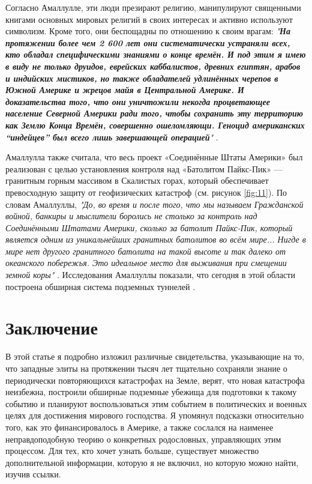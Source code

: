 \documentclass[10pt,twocolumn,letterpaper]{article}
\begin{document}
Согласно Амаллулле, эти люди презирают религию, манипулируют священными книгами основных мировых религий в своих интересах и активно используют символизм. Кроме того, они беспощадны по отношению к своим врагам: \textit{"\textbf{На протяжении более чем 2 600 лет они систематически устраняли всех, кто обладал специфическими знаниями о конце времён. И под этим я имею в виду не только друидов, еврейских каббалистов, древних египтян, арабов и индийских мистиков, но также обладателей удлинённых черепов в Южной Америке и жрецов майя в Центральной Америке. И доказательства того, что они уничтожили некогда процветающее население Северной Америки ради того, чтобы сохранить эту территорию как Землю Конца Времён, совершенно ошеломляющи. Геноцид американских “индейцев” был всего лишь завершающей операцией}"} \cite{33,34}.

Амаллулла также считала, что весь проект «Соединённые Штаты Америки» был реализован с целью установления контроля над «Батолитом Пайкс-Пик» — гранитным горным массивом в Скалистых горах, который обеспечивает превосходную защиту от геофизических катастроф (см. рисунок \ref{fig:11}). По словам Амаллуллы, \textit{"До, во время и после того, что мы называем Гражданской войной, банкиры и мыслители боролись не столько за контроль над Соединёнными Штатами Америки, сколько за батолит Пайкс-Пик, который является одним из уникальнейших гранитных батолитов во всём мире... Нигде в мире нет другого гранитного батолита на такой высоте и так далеко от океанского побережья. Это идеальное место для выживания при смещении земной коры"} \cite{33,34}. Исследования Амаллуллы показали, что сегодня в этой области построена обширная система подземных туннелей \cite{36}.
\section{Заключение}

В этой статье я подробно изложил различные свидетельства, указывающие на то, что западные элиты на протяжении тысяч лет тщательно сохраняли знание о периодически повторяющихся катастрофах на Земле, верят, что новая катастрофа неизбежна, построили обширные подземные убежища для подготовки к такому событию и планируют воспользоваться этим событием в политических и военных целях для достижения мирового господства. Я упомянул подсказки относительно того, как это финансировалось в Америке, а также сослался на наименее неправдоподобную теорию о конкретных родословных, управляющих этим процессом. Для тех, кто хочет узнать больше, существует множество дополнительной информации, которую я не включил, но которую можно найти, изучив ссылки.
\end{document}
